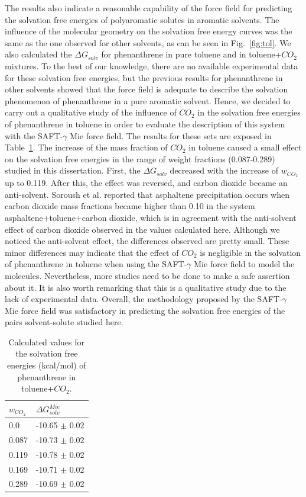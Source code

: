 \documentclass[final,12p,times,twocolumn]{elsarticle}
\begin{document}
	The results also indicate a reasonable capability of the force field for predicting the solvation free energies of polyaromatic solutes in aromatic solvents. The influence of the molecular geometry on the solvation free energy curves was the same as the one observed for other solvents, as can be seen in Fig.~\ref{fig:tol}.  We also calculated the $\Delta G_{solv}$ for phenanthrene in pure toluene and in toluene+$CO_{2}$ mixtures. To the best of our knowledge, there are no available experimental data for these solvation free energies, but the previous results for phenanthrene in other solvents showed that the force field is adequate to describe the solvation phenomenon of phenanthrene in a pure aromatic solvent. Hence, we decided to carry out a qualitative study of the influence of $CO_{2}$ in the solvation free energies of phenanthrene in toluene in order to evaluate the description of this system with the SAFT-$\gamma$ Mie force field. The results for these sets are exposed in Table~\ref{tbl:solvco2}. The increase of the mass fraction of $CO_{2}$ in toluene caused a small effect on the solvation free energies in the range of weight fractions (0.087-0.289) studied in this dissertation. First, the $\Delta G_{solv}$ decreased with the increase of $w_{CO_{2}}$ up to 0.119. After this, the effect was reversed, and carbon dioxide became an anti-solvent. Soroush et al. \cite{SOROUSH2014405} reported that asphaltene precipitation occurs when carbon dioxide mass fractions became higher than 0.10 in the system asphaltene+toluene+carbon dioxide, which is in agreement with the anti-solvent effect of carbon dioxide observed in the values calculated here. Although we noticed the anti-solvent effect, the differences observed are pretty small. These minor differences may indicate that the effect of $CO_{2}$ is negligible in the solvation of phenanthrene in toluene when using the SAFT-$\gamma$ Mie force field to model the molecules. Nevertheless, more studies need to be done to make a safe assertion about it. It is also worth remarking that this is a qualitative study due to the lack of experimental data. Overall, the methodology proposed by the SAFT-$\gamma$ Mie force field was satisfactory in predicting the solvation free energies of the pairs solvent-solute studied here.  
	
	\begin{table}
		\centering
		\caption{Calculated values for the solvation free energies (kcal/mol) of phenanthrene in toluene+$CO_{2}$.}
		\label{tbl:solvco2}
		\begin{tabular}{ll}
			\hline\hline
			$w_{CO_{2}}$ & $\Delta G_{solv}^{Mie}$ \\ \hline
			0.0          & -10.65 $\pm$ 0.02       \\
			0.087        & -10.73 $\pm$ 0.02       \\
			0.119        & -10.78 $\pm$ 0.02       \\
			0.169        & -10.71 $\pm$ 0.02       \\
			0.289        & -10.69 $\pm$ 0.02       \\ \hline\hline
		\end{tabular}
	\end{table}
	
\end{document}
